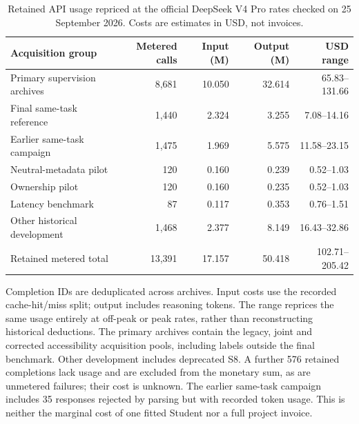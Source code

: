 \begin{table}[pos=htbp]
\centering\small
\caption{Retained API usage repriced at the official DeepSeek V4 Pro rates checked on 25 September 2026. Costs are estimates in USD, not invoices.}
\label{tab:api_cost}
\setlength{\tabcolsep}{3pt}
\begin{tabularx}{\linewidth}{@{}Xrrrr@{}}
\toprule
Acquisition group & Metered calls & Input (M) & Output (M) & USD range \\
\midrule
Primary supervision archives & 8,681 & 10.050 & 32.614 & 65.83--131.66 \\
Final same-task reference & 1,440 & 2.324 & 3.255 & 7.08--14.16 \\
Earlier same-task campaign & 1,475 & 1.969 & 5.575 & 11.58--23.15 \\
Neutral-metadata pilot & 120 & 0.160 & 0.239 & 0.52--1.03 \\
Ownership pilot & 120 & 0.160 & 0.235 & 0.52--1.03 \\
Latency benchmark & 87 & 0.117 & 0.353 & 0.76--1.51 \\
Other historical development & 1,468 & 2.377 & 8.149 & 16.43--32.86 \\
Retained metered total & 13,391 & 17.157 & 50.418 & 102.71--205.42 \\
\bottomrule
\end{tabularx}
\par\smallskip\begin{minipage}{\linewidth}\footnotesize
Completion IDs are deduplicated across archives. Input costs use the recorded cache-hit/miss split; output includes reasoning tokens. The range reprices the same usage entirely at off-peak or peak rates, rather than reconstructing historical deductions. The primary archives contain the legacy, joint and corrected accessibility acquisition pools, including labels outside the final benchmark. Other development includes deprecated S8. A further 576 retained completions lack usage and are excluded from the monetary sum, as are unmetered failures; their cost is unknown. The earlier same-task campaign includes 35 responses rejected by parsing but with recorded token usage. This is neither the marginal cost of one fitted Student nor a full project invoice.
\end{minipage}
\end{table}
